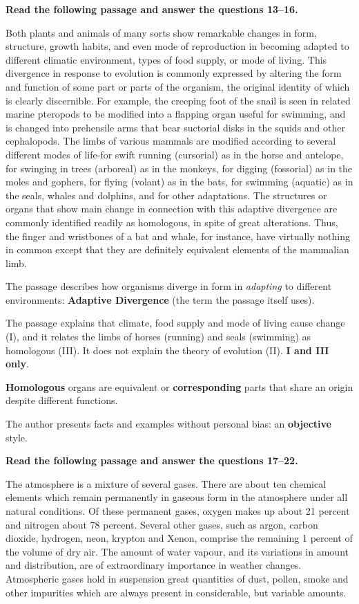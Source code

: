 \textbf{Read the following passage and answer the questions 13--16.}\par\smallskip
Both plants and animals of many sorts show remarkable changes in form, structure, growth habits, and even mode of reproduction in becoming adapted to different climatic environment, types of food supply, or mode of living. This divergence in response to evolution is commonly expressed by altering the form and function of some part or parts of the organism, the original identity of which is clearly discernible. For example, the creeping foot of the snail is seen in related marine pteropods to be modified into a flapping organ useful for swimming, and is changed into prehensile arms that bear suctorial disks in the squids and other cephalopods. The limbs of various mammals are modified according to several different modes of life-for swift running (cursorial) as in the horse and antelope, for swinging in trees (arboreal) as in the monkeys, for digging (fossorial) as in the moles and gophers, for flying (volant) as in the bats, for swimming (aquatic) as in the seals, whales and dolphins, and for other adaptations. The structures or organs that show main change in connection with this adaptive divergence are commonly identified readily as homologous, in spite of great alterations. Thus, the finger and wristbones of a bat and whale, for instance, have virtually nothing in common except that they are definitely equivalent elements of the mammalian limb.

The passage describes how organisms diverge in form in \emph{adapting} to different environments: \textbf{Adaptive Divergence} (the term the passage itself uses).

The passage explains that climate, food supply and mode of living cause change (I), and it relates the limbs of horses (running) and seals (swimming) as homologous (III). It does not explain the theory of evolution (II). \textbf{I and III only}.

\textbf{Homologous} organs are equivalent or \textbf{corresponding} parts that share an origin despite different functions.

The author presents facts and examples without personal bias: an \textbf{objective} style.

\textbf{Read the following passage and answer the questions 17--22.}\par\smallskip
The atmosphere is a mixture of several gases. There are about ten chemical elements which remain permanently in gaseous form in the atmosphere under all natural conditions. Of these permanent gases, oxygen makes up about 21 percent and nitrogen about 78 percent. Several other gases, such as argon, carbon dioxide, hydrogen, neon, krypton and Xenon, comprise the remaining 1 percent of the volume of dry air. The amount of water vapour, and its variations in amount and distribution, are of extraordinary importance in weather changes. Atmospheric gases hold in suspension great quantities of dust, pollen, smoke and other impurities which are always present in considerable, but variable amounts.

